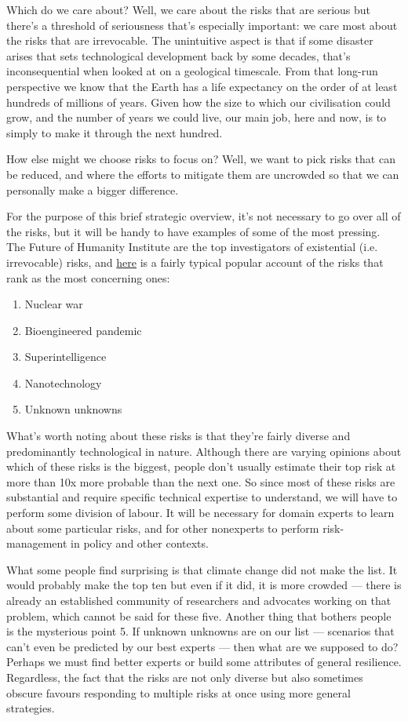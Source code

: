 \documentclass[12pt]{article}
\begin{document}
Which do we care about? Well, we care about the risks that are serious but there's a threshold of 
seriousness that's especially important: we care most about the risks that are irrevocable. 
The unintuitive aspect is that if some disaster arises that sets technological development back by some decades, 
that's inconsequential when looked at on a geological timescale. From that long-run perspective
we know that the Earth has a life expectancy on the order of at least hundreds of millions 
of years. Given how the size to which our civilisation could grow, and the number of years we 
could live, our main job, here and now, is to simply to make it through the next hundred.

How else might we choose risks to focus on? Well, we want to pick risks that can be reduced, and where 
the efforts to mitigate them are uncrowded so that we can personally make a bigger difference.

For the purpose of this brief strategic overview, it's not necessary to go over all of the risks, 
but it will be handy to have examples of some of the most pressing. The Future of Humanity Institute are 
the top investigators of existential (i.e. irrevocable) risks, and 
\href{https://theconversation.com/the-five-biggest-threats-to-human-existence-27053}{here} is a fairly typical popular 
account of the risks that rank as the most concerning ones:
\begin{enumerate}
    \item Nuclear war
    \item Bioengineered pandemic
    \item Superintelligence
    \item Nanotechnology
    \item Unknown unknowns 
\end{enumerate}

What's worth noting about these risks is that they're fairly diverse and predominantly technological in nature. 
Although there are varying opinions about which of these risks is the biggest, people don't usually 
estimate their top risk at more than 10x more probable than the next one. So since most of these 
risks are substantial and require specific technical expertise to understand, we will have to perform 
some division of labour. It will be necessary for domain experts to learn about some particular risks, 
and for other nonexperts to perform risk-management in policy and other contexts.

What some people find surprising is that climate change did not make the list. It would probably make the top ten 
but even if it did, it is more crowded --- there is already an established community of researchers and advocates 
working on that problem, which cannot be said for these five. Another thing that bothers people is the mysterious 
point 5. If unknown unknowns are on our list --- scenarios that can't even be predicted by our best experts --- then 
what are we supposed to do? Perhaps we must find better experts or build some attributes of general resilience. 
Regardless, the fact that the risks are not only diverse but also sometimes obscure favours responding to multiple 
risks at once using more general strategies.
\end{document}
